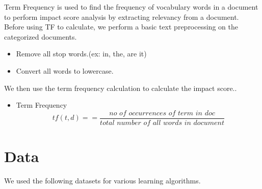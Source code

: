 \documentclass[paper=a4, fontsize=11pt]{scrartcl}
\numberwithin{equation}{section}		%
\numberwithin{figure}{section}			%
\numberwithin{table}{section}				%
\begin{document}
Term Frequency is used to find the frequency of vocabulary words in a document to perform impact score analysis by extracting relevancy from a document.
Before using TF to calculate, we perform a basic text preprocessing on the categorized documents.
\begin{itemize}
\item {Remove all stop words.(ex: in, the, are it)}
\item {Convert all words to lowercase.}
\end {itemize}
We then use the term frequency calculation to calculate the impact score..
\begin{itemize}
\item {Term Frequency}
\[tf(t,d) =  = \frac{\textit{no of occurrences of term in doc} }{\textit{total number of all words in document}}\]
\end{itemize}



\section{Data}
We used the following datasets for various learning algorithms.
\end{document}
